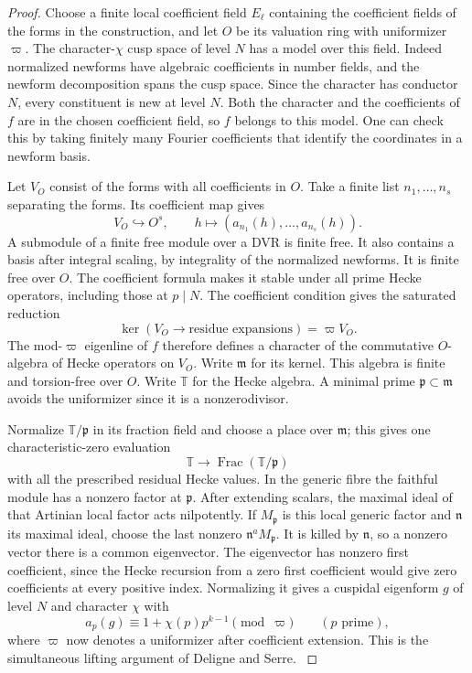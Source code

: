 \begin{proof}

Choose a finite local coefficient field \(E_\ell\) containing the
coefficient fields of the forms in the construction, and let \(O\)
be its valuation ring with uniformizer \(\varpi\). The
character-\(\chi\) cusp space of level \(N\) has a model over
this field. Indeed normalized newforms have algebraic
coefficients in number fields, and the newform decomposition
spans the cusp space. Since the character has conductor \(N\),
every constituent is new at level \(N\). Both the character
and the coefficients of \(f\) are in the chosen coefficient
field, so \(f\) belongs to this model. One can check this by
taking finitely many Fourier coefficients that identify the
coordinates in a newform basis.

Let \(V_O\) consist of the forms with all coefficients in \(O\).
Take a finite list \(n_1,\ldots,n_s\) separating the forms. Its coefficient map gives
\[
 V_O\hookrightarrow O^s,\qquad h\longmapsto
 (a_{n_1}(h),\ldots,a_{n_s}(h)).
\]
A submodule of a finite free module over a DVR is finite free.
It also contains a basis after integral scaling, by
integrality of the normalized newforms. It is finite free
over \(O\). The coefficient formula makes it stable under
all prime Hecke operators, including those at \(p\mid N\). The coefficient condition gives the saturated reduction
\[
       \ker(V_O\longrightarrow \text{residue expansions})
                                      =\varpi V_O.
\] The mod-\(\varpi\) eigenline of \(f\) therefore
defines a character of the commutative \(O\)-algebra of
Hecke operators on \(V_O\). Write \(\mathfrak m\) for its
kernel. This algebra is finite and torsion-free over \(O\).
Write \(\mathbb T\) for the Hecke algebra. A minimal
prime \(\mathfrak p\subset\mathfrak m\) avoids the uniformizer
since it is a nonzerodivisor.

Normalize \(\mathbb T/\mathfrak p\)
in its fraction field and choose a place over \(\mathfrak m\);
this gives one characteristic-zero evaluation
\[
 \mathbb T\longrightarrow
      \operatorname{Frac}(\mathbb T/\mathfrak p)
\]
with all the prescribed residual Hecke values.
In the generic fibre the faithful module has a nonzero
factor at \(\mathfrak p\). After extending scalars, the
maximal ideal of that Artinian local factor acts nilpotently.
If \(M_\mathfrak p\) is this local generic factor and
\(\mathfrak n\) its maximal ideal, choose the last nonzero
\(\mathfrak n^a M_\mathfrak p\). It is killed by \(\mathfrak n\),
so a nonzero vector there is a common eigenvector.
The eigenvector has nonzero first coefficient, since the
Hecke recursion from a zero first coefficient would give
zero coefficients at every positive index. Normalizing it
gives a cuspidal eigenform \(g\) of level \(N\) and character
\(\chi\) with
\[
    a_p(g)\equiv1+\chi(p)p^{k-1}\pmod{\varpi}
       \qquad(p\text{ prime}),
\]
where \(\varpi\) now denotes a uniformizer after coefficient
extension. This is the simultaneous lifting argument of
Deligne and Serre. \cite[Lemma 6.11]{deligne-serre}


\end{proof}
